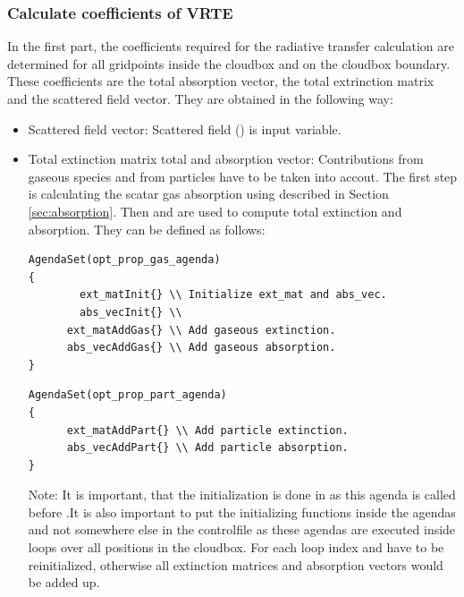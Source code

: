 \subsubsection{Calculate coefficients of VRTE} In the first part, the
coefficients required for the radiative transfer calculation are
determined for all gridpoints inside the cloudbox and on the cloudbox
boundary. These coefficients are the total absorption vector, the
total extrinction matrix and the scattered field vector. They are
obtained in the following way:
\begin{itemize}
\item Scattered field vector: Scattered field
  () is input variable.
\item Total extinction matrix total and absorption vector:
  Contributions from gaseous species and from particles have to be
  taken into accout.  The first step is calculating the scatar gas
  absorption using 
  described in Section \ref{sec:absorption}.  Then
   and
   are used to compute total
  extinction and absorption. They can be defined as follows:
  
  \vspace{1ex}
\begin{minipage}{0.9\hsize}
\begin{verbatim}
AgendaSet(opt_prop_gas_agenda)
{
        ext_matInit{} \\ Initialize ext_mat and abs_vec.
        abs_vecInit{} \\ 
      ext_matAddGas{} \\ Add gaseous extinction.              
      abs_vecAddGas{} \\ Add gaseous absorption.
}
\end{verbatim}
\end{minipage} 

\vspace{1ex}
\begin{minipage}{0.9\hsize}
\begin{verbatim}
AgendaSet(opt_prop_part_agenda)
{
      ext_matAddPart{} \\ Add particle extinction.            
      abs_vecAddPart{} \\ Add particle absorption.
}
\end{verbatim}
\end{minipage} 

Note: It is important, that the initialization is done in
 as this agenda is called before
.It is also important to put the
initializing functions inside the agendas and not somewhere else in
the controlfile as these agendas are executed inside loops over all
positions in the cloudbox. For each loop index  and
 have to be reinitialized, otherwise all extinction
matrices and absorption vectors would be added up.


\end{itemize}
